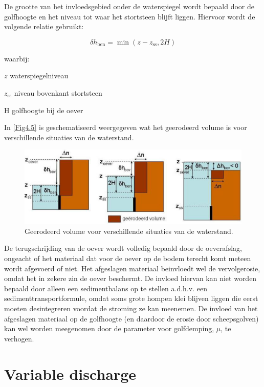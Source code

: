 De grootte van het invloedsgebied onder de waterspiegel wordt bepaald door de golfhoogte en het niveau tot waar het stortsteen blijft liggen.
Hiervoor wordt de volgende relatie gebruikt:

\begin{equation}
\delta h_\text{ben} = \min ( z-z_\text{ss}, 2 H )
\end{equation}

waarbij:

\begin{symbollist}
\item{$z$} waterspiegelniveau 
\item{$z_\text{ss}$} niveau bovenkant stortsteen 
\item{H} golfhoogte bij de oever 
\end{symbollist}

In \autoref{Fig4.5} is geschematiseerd weergegeven wat het geerodeerd volume is voor verschillende situaties van de waterstand.


\begin{figure}
\includegraphics[width=\textwidth]{figures/Fig4-5.png}
\caption{Geerodeerd volume voor verschillende situaties van de waterstand.}
\label{Fig4.5}
\end{figure}

De terugschrijding van de oever wordt volledig bepaald door de oeverafslag, ongeacht of het materiaal dat voor de oever op de bodem terecht komt meteen wordt afgevoerd of niet.
Het afgeslagen materiaal beinvloedt wel de vervolgerosie, omdat het in zekere zin de oever beschermt.
De invloed hiervan kan niet worden bepaald door alleen een sedimentbalans op te stellen a.d.h.v.
een sedimenttransportformule, omdat soms grote hompen klei blijven liggen die eerst moeten desintegreren voordat de stroming ze kan meenemen.
De invloed van het afgeslagen materiaal op de golfhoogte (en daardoor de erosie door scheepsgolven) kan wel worden meegenomen door de parameter voor golfdemping, $\mu$, te verhogen.

\section{Variable discharge} \label{Sec4.5}

